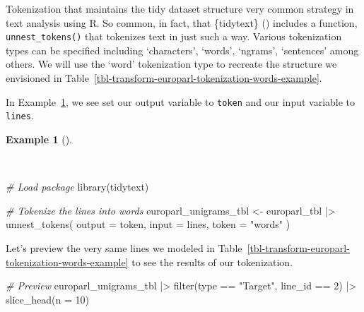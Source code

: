 \documentclass[
  letterpaper,
]{book}
\newenvironment{Shaded}{\begin{snugshade}}{\end{snugshade}}
\newcommand{\AttributeTok}[1]{\textcolor[rgb]{0.00,0.00,0.00}{#1}}
\newcommand{\CommentTok}[1]{\textcolor[rgb]{0.00,0.00,0.00}{\textit{#1}}}
\newcommand{\DecValTok}[1]{\textcolor[rgb]{0.00,0.00,0.00}{#1}}
\newcommand{\FunctionTok}[1]{\textcolor[rgb]{0.00,0.00,0.00}{#1}}
\newcommand{\NormalTok}[1]{\textcolor[rgb]{0.00,0.00,0.00}{#1}}
\newcommand{\OtherTok}[1]{\textcolor[rgb]{0.00,0.00,0.00}{#1}}
\newcommand{\SpecialCharTok}[1]{\textcolor[rgb]{0.00,0.00,0.00}{#1}}
\newcommand{\StringTok}[1]{\textcolor[rgb]{0.00,0.00,0.00}{#1}}
\theoremstyle{definition}
\newtheorem{example}{Example}[chapter]
\theoremstyle{remark}
\begin{document}
Tokenization that maintains the tidy dataset structure very common
strategy in text analysis using R. So common, in fact, that \{tidytext\}
() includes a
function, \texttt{unnest\_tokens()} that tokenizes text in just such a
way. Various tokenization types can be specified including `characters',
`words', `ngrams', `sentences' among others. We will use the `word'
tokenization type to recreate the structure we envisioned in
Table~\ref{tbl-transform-europarl-tokenization-words-example}.

In Example~\ref{exm-transform-europarl-tokenization-words-tidytext}, we
see set our output variable to \texttt{token} and our input variable to
\texttt{lines}.

\begin{example}[]\protect\hypertarget{exm-transform-europarl-tokenization-words-tidytext}{}\label{exm-transform-europarl-tokenization-words-tidytext}

~

\begin{Shaded}
\begin{Highlighting}[]
\CommentTok{\# Load package}
\FunctionTok{library}\NormalTok{(tidytext)}

\CommentTok{\# Tokenize the lines into words}
\NormalTok{europarl\_unigrams\_tbl }\OtherTok{\textless{}{-}}
\NormalTok{  europarl\_tbl }\SpecialCharTok{|\textgreater{}}
  \FunctionTok{unnest\_tokens}\NormalTok{(}
    \AttributeTok{output =}\NormalTok{ token,}
    \AttributeTok{input =}\NormalTok{ lines,}
    \AttributeTok{token =} \StringTok{"words"}
\NormalTok{  )}
\end{Highlighting}
\end{Shaded}

\end{example}

Let's preview the very same lines we modeled in
Table~\ref{tbl-transform-europarl-tokenization-words-example} to see the
results of our tokenization.

\begin{Shaded}
\begin{Highlighting}[]
\CommentTok{\# Preview}
\NormalTok{europarl\_unigrams\_tbl }\SpecialCharTok{|\textgreater{}}
  \FunctionTok{filter}\NormalTok{(type }\SpecialCharTok{==} \StringTok{"Target"}\NormalTok{, line\_id }\SpecialCharTok{==} \DecValTok{2}\NormalTok{) }\SpecialCharTok{|\textgreater{}}
  \FunctionTok{slice\_head}\NormalTok{(}\AttributeTok{n =} \DecValTok{10}\NormalTok{)}
\end{Highlighting}
\end{Shaded}
\end{document}
